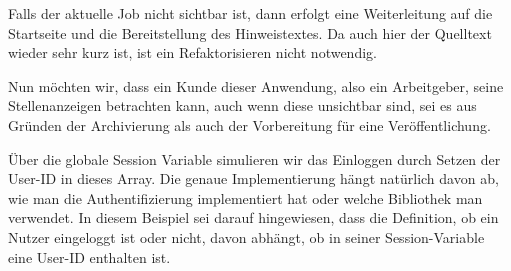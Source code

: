\tddgreen
Falls der aktuelle Job nicht sichtbar ist, dann erfolgt eine Weiterleitung auf die Startseite und die Bereitstellung des Hinweistextes.
\tddrefactor
Da auch hier der Quelltext wieder sehr kurz ist, ist ein Refaktorisieren nicht notwendig.

Nun möchten wir, dass ein Kunde dieser Anwendung, also ein Arbeitgeber, seine Stellenanzeigen betrachten kann, auch wenn diese unsichtbar sind, sei es aus Gründen der Archivierung als auch der Vorbereitung für eine Veröffentlichung.

%
%
%
\begin{ruby}[label=test/functional/job\_controller\_test.rb]
  
    
  \PY{o}{[}\PY{o}{]}  

      

   
\end{ruby}

\tddred
Über die globale Session Variable simulieren wir das Einloggen durch Setzen der User-ID in dieses Array. Die genaue Implementierung hängt natürlich davon ab, wie man die Authentifizierung implementiert hat oder welche Bibliothek man verwendet. In diesem Beispiel sei darauf hingewiesen, dass die Definition, ob ein Nutzer eingeloggt ist oder nicht, davon abhängt, ob in seiner Session-Variable eine User-ID enthalten ist.

%
\begin{ruby}[label=app/controllers/job\_controller.rb]
 
    \PY{o}{[}\PY{o}{]}
       \PY{o}{[}\PY{o}{]}
        
\end{ruby}

